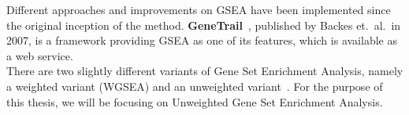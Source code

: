 Different approaches and improvements on GSEA have been implemented since the original inception of the method. \textbf{GeneTrail}~\cite{genetrail}, published by Backes et.\ al.\ in 2007, is a framework providing GSEA as one of its features, which is available as a web service.\\
There are two slightly different variants of Gene Set Enrichment Analysis, namely a weighted variant (WGSEA) and an unweighted variant~\cite{gsea_original}. For the purpose of this thesis, we will be focusing on Unweighted Gene Set Enrichment Analysis.



